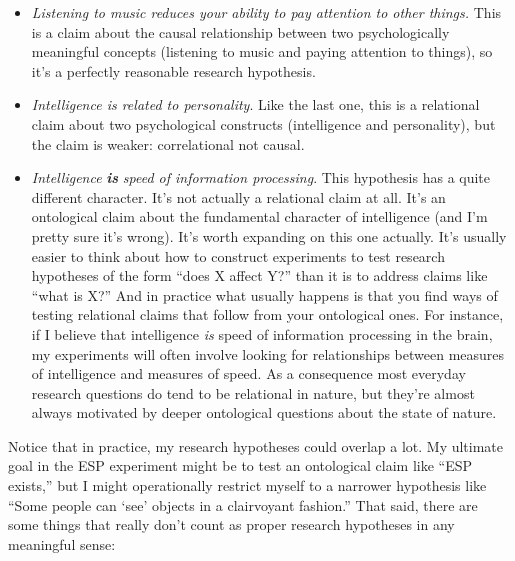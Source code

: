 \documentclass[
]{book}
\providecommand{\tightlist}{%
  \setlength{\itemsep}{0pt}\setlength{\parskip}{0pt}}
\begin{document}
\begin{itemize}
\tightlist
\item
  \emph{Listening to music reduces your ability to pay attention to other things.} This is a claim about the causal relationship between two psychologically meaningful concepts (listening to music and paying attention to things), so it's a perfectly reasonable research hypothesis.
\item
  \emph{Intelligence is related to personality}. Like the last one, this is a relational claim about two psychological constructs (intelligence and personality), but the claim is weaker: correlational not causal.
\item
  \emph{Intelligence} \textbf{\emph{is}} \emph{speed of information processing}. This hypothesis has a quite different character. It's not actually a relational claim at all. It's an ontological claim about the fundamental character of intelligence (and I'm pretty sure it's wrong). It's worth expanding on this one actually. It's usually easier to think about how to construct experiments to test research hypotheses of the form ``does X affect Y?'' than it is to address claims like ``what is X?'' And in practice what usually happens is that you find ways of testing relational claims that follow from your ontological ones. For instance, if I believe that intelligence \emph{is} speed of information processing in the brain, my experiments will often involve looking for relationships between measures of intelligence and measures of speed. As a consequence most everyday research questions do tend to be relational in nature, but they're almost always motivated by deeper ontological questions about the state of nature.
\end{itemize}

Notice that in practice, my research hypotheses could overlap a lot. My ultimate goal in the ESP experiment might be to test an ontological claim like ``ESP exists,'' but I might operationally restrict myself to a narrower hypothesis like ``Some people can `see' objects in a clairvoyant fashion.'' That said, there are some things that really don't count as proper research hypotheses in any meaningful sense:
\end{document}
